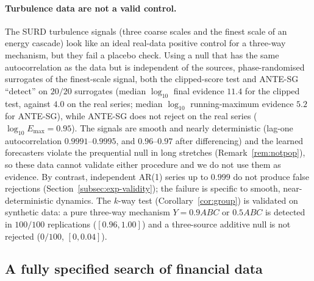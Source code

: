 \documentclass[pdflatex,sn-mathphys-ay]{sn-jnl}%
\theoremstyle{thmstyleone}%
\theoremstyle{thmstyletwo}%
\theoremstyle{thmstylethree}%
\begin{document}
\paragraph{Turbulence data are not a valid control.} The SURD turbulence signals (three coarse scales and the finest scale of an energy cascade) look like an ideal real-data positive control for a three-way mechanism, but they fail a placebo check. Using a null that has the same
autocorrelation as the data but is independent of the sources, phase-randomised surrogates of the finest-scale signal, both the clipped-score test and ANTE-SG ``detect'' on $20/20$ surrogates (median $\log_{10}$ final evidence $11.4$ for the clipped test, against $4.0$ on the real series;
median $\log_{10}$ running-maximum evidence $5.2$ for ANTE-SG), while ANTE-SG does not reject on the real series ($\log_{10}E_{\max}=0.95$). The signals are smooth and nearly deterministic (lag-one autocorrelation $0.9991$--$0.9995$, and $0.96$--$0.97$ after differencing) and the learned forecasters violate the prequential null in long stretches
(Remark~\ref{rem:notpop}), so these data cannot validate either procedure and we do not use them as evidence. By contrast, independent AR(1) series up to $0.999$ do not produce false rejections (Section~\ref{subsec:exp-validity}); the failure is specific to smooth, near-deterministic dynamics.
The $k$-way test (Corollary~\ref{cor:group}) is validated on synthetic data: a pure three-way mechanism $Y=0.9ABC$ or $0.5ABC$ is detected in $100/100$ replications ($[0.96,1.00]$) and a three-source additive null is not rejected ($0/100$, $[0,0.04]$).

\subsection{A fully specified search of financial data}\label{subsec:exp-fin}
\end{document}
